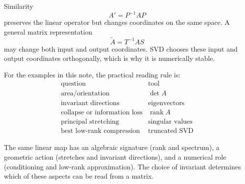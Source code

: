 Similarity
\[
  A'=P^{-1}AP
\]
preserves the linear operator but changes coordinates on the same space.  A general matrix representation
\[
  \widetilde A=T^{-1}AS
\]
may change both input and output coordinates.  SVD chooses these input and output coordinates orthogonally, which is why it is numerically stable.

For the examples in this note, the practical reading rule is:
\[
\begin{array}{c|c}
\text{question} & \text{tool}\\
\hline
\text{area/orientation} & \det A\\
\text{invariant directions} & \text{eigenvectors}\\
\text{collapse or information loss} & \operatorname{rank}A\\
\text{principal stretching} & \text{singular values}\\
\text{best low-rank compression} & \text{truncated SVD}
\end{array}
\]

The same linear map has an algebraic signature (rank and spectrum), a geometric action (stretches and invariant directions), and a numerical role (conditioning and low-rank approximation). The choice of invariant determines which of these aspects can be read from a matrix.
